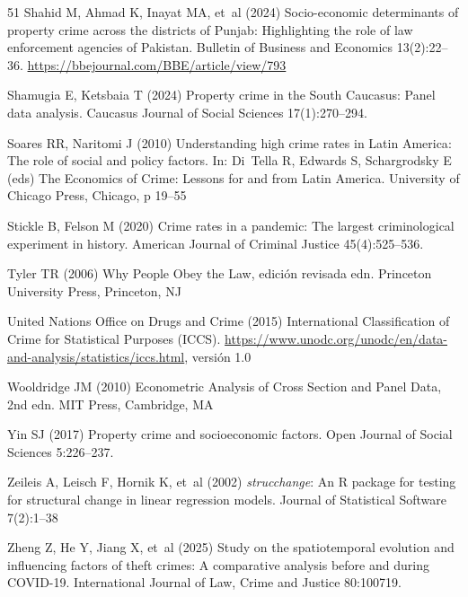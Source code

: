 \documentclass[pdflatex,sn-basic]{sn-jnl}
\begin{document}
\begin{thebibliography}{51}
Shahid M, Ahmad K, Inayat MA, et~al (2024) Socio-economic determinants of
  property crime across the districts of {Punjab}: {H}ighlighting the role of
  law enforcement agencies of {Pakistan}. Bulletin of Business and Economics
  13(2):22--36. \urlprefix\url{https://bbejournal.com/BBE/article/view/793}

Shamugia E, Ketsbaia T (2024) Property crime in the {South Caucasus}: Panel
  data analysis. Caucasus Journal of Social Sciences 17(1):270--294.

Soares RR, Naritomi J (2010) Understanding high crime rates in {Latin America}:
  {T}he role of social and policy factors. In: Di~Tella R, Edwards S,
  Schargrodsky E (eds) The Economics of Crime: Lessons for and from {Latin
  America}. University of Chicago Press, Chicago, p 19--55

Stickle B, Felson M (2020) Crime rates in a pandemic: {T}he largest
  criminological experiment in history. American Journal of Criminal Justice
  45(4):525--536. 

Tyler TR (2006) Why People Obey the Law, edici\'on revisada edn. Princeton
  University Press, Princeton, NJ

{United Nations Office on Drugs and Crime} (2015) International
  {C}lassification of {C}rime for {S}tatistical {P}urposes ({ICCS}).
  \urlprefix\url{https://www.unodc.org/unodc/en/data-and-analysis/statistics/iccs.html},
  versi\'on 1.0

Wooldridge JM (2010) Econometric Analysis of Cross Section and Panel Data, 2nd
  edn. MIT Press, Cambridge, MA

Yin SJ (2017) Property crime and socioeconomic factors. Open Journal of Social
  Sciences 5:226--237. 

Zeileis A, Leisch F, Hornik K, et~al (2002) \textit{strucchange}: {An} {R}
  package for testing for structural change in linear regression models.
  Journal of Statistical Software 7(2):1--38

Zheng Z, He Y, Jiang X, et~al (2025) Study on the spatiotemporal evolution and
  influencing factors of theft crimes: {A} comparative analysis before and
  during {COVID-19}. International Journal of Law, Crime and Justice 80:100719.

\end{thebibliography}
\end{document}
